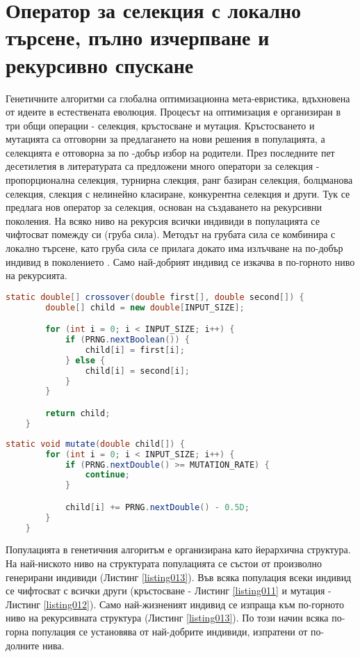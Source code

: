 \section{Оператор за селекция с локално търсене, пълно изчерпване и рекурсивно спускане}

Генетичните алгоритми са глобална оптимизационна мета-евристика, вдъхновена от идеите в естествената еволюция. Процесът на оптимизация е организиран в три общи операции - селекция, кръстосване и мутация. Кръстосването и мутацията са отговорни за предлагането на нови решения в популацията, а селекцията е отговорна за по -добър избор на родители. През последните пет десетилетия в литературата са предложени много оператори за селекция - пропорционална селекция, турнирна слекция, ранг базиран селекция, болцманова селекция, слекция с нелинейно класиране, конкурентна селекция и други. Тук се предлага нов оператор за селекция, основан на създаването на рекурсивни поколения. На всяко ниво на рекурсия всички индивиди в популацията се чифтосват помежду си (груба сила). Методът на грубата сила се комбинира с локално търсене, като груба сила се прилага докато има излъчване на по-добър индивид в поколението \cite{Balabanov-01}. Само най-добрият индивид се изкачва в по-горното ниво на рекурсията. 

\begin{lstlisting}[caption=Равномерно кръстосване, language=Java, basicstyle=\tiny, label=listing011]
	static double[] crossover(double first[], double second[]) {
		double[] child = new double[INPUT_SIZE];

		for (int i = 0; i < INPUT_SIZE; i++) {
			if (PRNG.nextBoolean()) {
				child[i] = first[i];
			} else {
				child[i] = second[i];
			}
		}

		return child;
	}
\end{lstlisting}

\begin{lstlisting}[caption=Мутация със случайно число, language=Java, basicstyle=\tiny, label=listing012]
	static void mutate(double child[]) {
		for (int i = 0; i < INPUT_SIZE; i++) {
			if (PRNG.nextDouble() >= MUTATION_RATE) {
				continue;
			}

			child[i] += PRNG.nextDouble() - 0.5D;
		}
	}
\end{lstlisting}

Популацията в генетичния алгоритъм е организирана като йерархична структура. На най-ниското ниво на структурата популацията се състои от произволно генерирани индивиди (Листинг \ref{listing013}). Във всяка популация всеки индивид се чифтосват с всички други (кръстосване - Листинг \ref{listing011} и мутация - Листинг \ref{listing012}). Само най-жизненият индивид се изпраща към по-горното ниво на рекурсивната структура (Листинг \ref{listing013}). По този начин всяка по-горна популация се установява от най-добрите индивиди, изпратени от по-долните нива.

